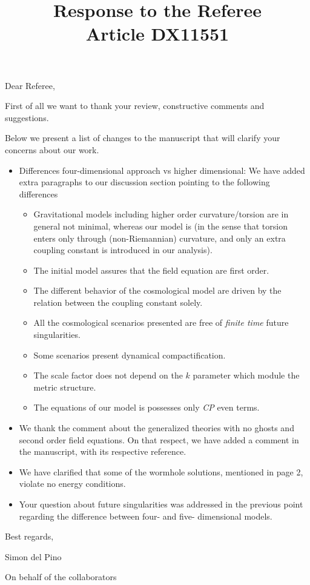 \documentclass[11pt]{article}
\date{}
\title{Response to the Referee\\\medskip
\large Article DX11551}
\begin{document}
\maketitle
Dear Referee,

First of all we want to thank your review, constructive comments and
suggestions.

Below we present a list of changes to the manuscript that will clarify
your concerns about our work.

\begin{itemize}
\item Differences four-dimensional approach vs higher dimensional: We have
added extra paragraphs to our discussion section pointing to the
following differences
\begin{itemize}
\item Gravitational models including higher order curvature/torsion are in
general not minimal, whereas our model is (in the sense that
torsion enters only through (non-Riemannian) curvature, and only an
extra coupling constant is introduced in our analysis).
\item The initial model assures that the field equation are first order.
\item The different behavior of the cosmological model are driven by the
relation between the coupling constant solely.
\item All the cosmological scenarios presented are free of \emph{finite time}
future singularities.
\item Some scenarios present dynamical compactification.
\item The scale factor does not depend on the \(k\) parameter which module
the metric structure.
\item The equations of our model is possesses only \emph{CP} even terms.
\end{itemize}

\item We thank the comment about the generalized theories with no ghosts
and second order field equations. On that respect, we have added a
comment in the manuscript, with its respective reference.

\item We have clarified that some of the wormhole solutions, mentioned in
page 2, violate no energy conditions.

\item Your question about future singularities was addressed in the
previous point regarding the difference between four- and five-
dimensional models.
\end{itemize}

\begin{center}
Best regards,

Simon del Pino

On behalf of the collaborators
\end{center}
\end{document}
